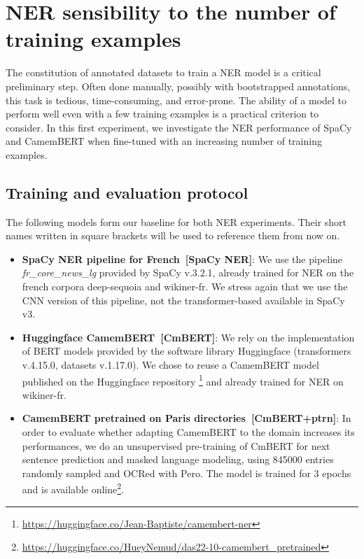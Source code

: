 \section{NER sensibility to the number of training examples}
\label{sec:ner-xp1}
The constitution of annotated datasets to train a NER model is a critical preliminary step.
Often done manually, possibly with bootstrapped annotations, this task is tedious, time-consuming, and error-prone.
The ability of a model to perform well even with a few training examples is a practical criterion to consider.
In this first experiment, we investigate the NER performance of SpaCy and CamemBERT when fine-tuned with an increasing number of training examples.

\subsection{Training and evaluation protocol}
\label{sec:ner-xp1-protocol}
The following models form our baseline for both NER experiments.
Their short names written in square brackets will be used to reference them from now on.
\begin{itemize}
    \item \textbf{SpaCy NER pipeline for French~[SpaCy NER]}: We use the pipeline \textit{fr\_core\_news\_lg} provided by SpaCy v.3.2.1, already trained for NER on the french corpora deep-sequoia and wikiner-fr.
    We stress again that we use the CNN version of this pipeline, not the transformer-based available in SpaCy v3.
    \item \textbf{Huggingface CamemBERT~[CmBERT]}: We rely on the implementation of BERT models provided by the software library Huggingface (transformers v.4.15.0, datasets v.1.17.0).
We chose to reuse a CamemBERT model published on the Huggingface repository \footnote{\url{https://huggingface.co/Jean-Baptiste/camembert-ner}} and already trained for NER on wikiner-fr.
\item \textbf{CamemBERT pretrained on Paris directories~[CmBERT+ptrn]}: 
In order to evaluate whether adapting CamemBERT to the domain increases its performances, we do an unsupervised pre-training of CmBERT for next sentence prediction and masked language modeling, using \num{845000} entries randomly sampled and OCRed with Pero.
The model is trained for 3 epochs and is available online\footnote{\url{https://huggingface.co/HueyNemud/das22-10-camembert_pretrained}}.
\end{itemize}


